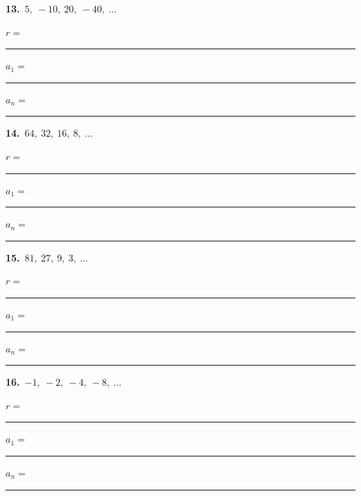 \documentclass[11pt,letterpaper]{article}
\begin{document}
\needspace{2.3cm}\par\vspace{3mm}\noindent\begin{minipage}[t]{0.48\linewidth}{\color{fmturn}\bfseries 13.}\ $5,\ -10,\ 20,\ -40,\ \ldots$\par\vspace{2mm}\hspace*{4mm}$r=$\,\rule{1.2cm}{0.4pt}\par\vspace{2.5mm}\hspace*{4mm}$a_1=$\,\rule{1.4cm}{0.4pt}\quad $a_n=$\,\rule{2.6cm}{0.4pt}\end{minipage}\hfill\begin{minipage}[t]{0.48\linewidth}{\color{fmturn}\bfseries 14.}\ $64,\ 32,\ 16,\ 8,\ \ldots$\par\vspace{2mm}\hspace*{4mm}$r=$\,\rule{1.2cm}{0.4pt}\par\vspace{2.5mm}\hspace*{4mm}$a_1=$\,\rule{1.4cm}{0.4pt}\quad $a_n=$\,\rule{2.6cm}{0.4pt}\end{minipage}\par\vspace{1.3cm}
\needspace{2.3cm}\par\vspace{3mm}\noindent\begin{minipage}[t]{0.48\linewidth}{\color{fmturn}\bfseries 15.}\ $81,\ 27,\ 9,\ 3,\ \ldots$\par\vspace{2mm}\hspace*{4mm}$r=$\,\rule{1.2cm}{0.4pt}\par\vspace{2.5mm}\hspace*{4mm}$a_1=$\,\rule{1.4cm}{0.4pt}\quad $a_n=$\,\rule{2.6cm}{0.4pt}\end{minipage}\hfill\begin{minipage}[t]{0.48\linewidth}{\color{fmturn}\bfseries 16.}\ $-1,\ -2,\ -4,\ -8,\ \ldots$\par\vspace{2mm}\hspace*{4mm}$r=$\,\rule{1.2cm}{0.4pt}\par\vspace{2.5mm}\hspace*{4mm}$a_1=$\,\rule{1.4cm}{0.4pt}\quad $a_n=$\,\rule{2.6cm}{0.4pt}\end{minipage}\par\vspace{1.3cm}
\end{document}
